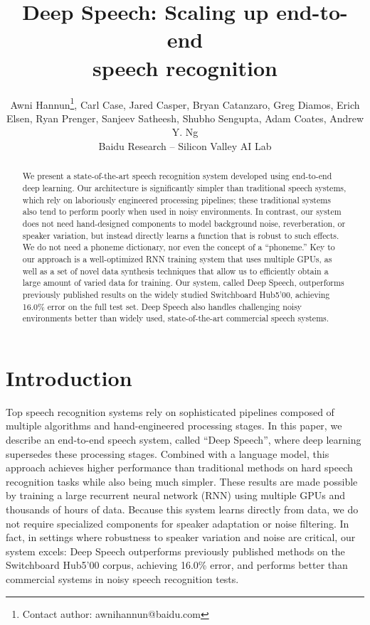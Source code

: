 \documentclass{article}
\title{Deep Speech:  Scaling up end-to-end \\ speech recognition}
\author{Awni Hannun\thanks{Contact author:  awnihannun@baidu.com}, Carl Case, Jared Casper, Bryan Catanzaro, Greg Diamos, Erich Elsen, \And Ryan Prenger, Sanjeev Satheesh, Shubho Sengupta, Adam Coates, Andrew Y. Ng \\[10pt]
Baidu Research -- Silicon Valley AI Lab
}
\begin{document}
 
\maketitle
\vskip -0.2in
\begin{abstract} 

We present a state-of-the-art speech recognition system developed using
end-to-end deep learning.  Our architecture is significantly simpler than
traditional speech systems, which rely on laboriously engineered processing
pipelines; these traditional systems also tend to perform poorly when used in
noisy environments.  In contrast, our system does not need hand-designed
components to model background noise, reverberation, or speaker variation, but
instead directly learns a function that is robust to such effects.  We do not
need a phoneme dictionary, nor even the concept of a ``phoneme.''  Key to our
approach is a well-optimized RNN training system that uses multiple GPUs, as
well as a set of novel data synthesis techniques that allow us to efficiently
obtain a large amount of varied data for training.  Our system, called Deep
Speech, outperforms previously published results on the widely studied
Switchboard Hub5'00, achieving 16.0\% error on the full test set.  Deep Speech
also handles challenging noisy environments better than widely used,
state-of-the-art commercial speech systems. 

\end{abstract}

\section{Introduction}
\label{sec:introduction}

Top speech recognition systems rely on sophisticated pipelines composed of
multiple algorithms and hand-engineered processing stages.  In this paper, we
describe an end-to-end speech system, called ``Deep Speech'', where deep
learning supersedes these processing stages.  Combined with a language model,
this approach achieves higher performance than traditional methods on hard
speech recognition tasks while also being much simpler.  These results are made
possible by training a large recurrent neural network (RNN) using multiple GPUs
and thousands of hours of data.  Because this system learns directly from data,
we do not require specialized components for speaker adaptation or noise
filtering.  In fact, in settings where robustness to speaker variation and
noise are critical, our system excels:  Deep Speech outperforms previously
published methods on the Switchboard Hub5'00 corpus, achieving 16.0\% error,
and performs better than commercial systems in noisy speech recognition tests.
\end{document}
